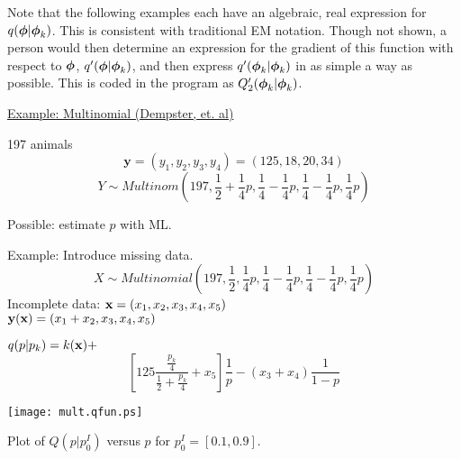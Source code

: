\documentclass{slides}
\begin{document}
\begin{note}
Note that the following examples each have an algebraic, real expression for
$q(\mbox{\boldmath $\phi$} | \mbox{\boldmath $\phi$}_k)$.  This is consistent with traditional EM notation. 
Though not shown, a person would then determine an expression for the gradient
of this function with respect to $\mbox{\boldmath $\phi$}$, $q'(\mbox{\boldmath $\phi$} | \mbox{\boldmath $\phi$}_k)$, and then
express $q'(\mbox{\boldmath $\phi$}_k | \mbox{\boldmath $\phi$}_k)$ in as simple a way as possible.  This is
coded in the program as $Q'_2(\mbox{\boldmath $\phi$}_k | \mbox{\boldmath $\phi$}_k)$.
\end{note}
\begin{slide}
\begin{center} 
\underline{Example: Multinomial (Dempster, et. al)}
\end{center}
197 animals 
$$\mathbf{y} = (y_1, y_2, y_3, y_4) = (125, 18, 20, 34)$$
$$
Y \sim Multinom\left(197, \frac{1}{2} + \frac{1}{4} p,    
  \frac{1}{4} - \frac{1}{4} p, 
  \frac{1}{4} - \frac{1}{4} p, \frac{1}{4} p \right)
$$ 

Possible: estimate $p$ with ML.  

Example: Introduce missing data.
$$
X \sim Multinomial\left(197, \frac{1}{2}, \frac{1}{4}p, 
  \frac{1}{4} - \frac{1}{4} p , 
  \frac{1}{4} - \frac{1}{4} p , \frac{1}{4} p\right)
$$
Incomplete data: ${\bf x} = (x_1, x_2, x_3, x_4, x_5) $ \\
$ \mathbf{y}({\bf x} ) = (x_1 + x_2, x_3, x_4, x_5)$

$
q(p | p_k) = k({\bf x}) +
$
$$
\left[125\frac{\frac{p_k}{4}}{\frac{1}{2}+\frac{p_k}{4}}+x_5
\right]\frac{1}{p} - 
(x_3 + x_4) \frac{1}{1-p}
$$
\end{slide}
\begin{slide}
\begin{center}
\resizebox{15 cm}{15 cm} {\texttt{[image: mult.qfun.ps]}}

Plot of $Q(p|p_0^I)$ versus $p$ for $p_0^I=[0.1,0.9]$.
\end{center}
\end{slide}
\end{document}
